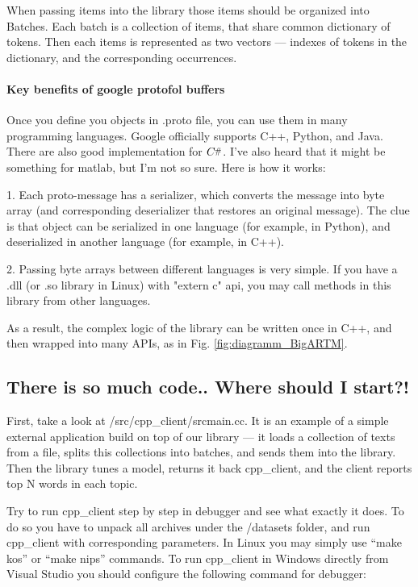 \documentclass[11pt,a4paper,twoside]{report}
\newcommand{\Csharp}{%
  {\settoheight{\dimen0}{C}C\kern-.05em \resizebox{!}{\dimen0}{\raisebox{\depth}{\#}}}}
\begin{document}
When passing items into the library those items should be organized into Batches.
Each batch is a collection of items, that share common dictionary of tokens.
Then each items is represented as two vectors --- indexes of tokens in the dictionary,
and the corresponding occurrences.

\paragraph{Key benefits of google protofol buffers}

Once you define you objects in .proto file, you can use them in many programming languages.
Google officially supports C++, Python, and Java. There are also good implementation for $\Csharp$.
I've also heard that it might be something for matlab, but I'm not so sure. Here is how it works:

1. Each proto-message has a serializer, which converts the message into byte array
(and corresponding deserializer that restores an original message).
The clue is that object can be serialized in one language (for example, in Python),
and deserialized in another language (for example, in C++).

2. Passing byte arrays between different languages is very simple.
If you have a .dll (or .so library in Linux) with "extern c" api,
you may call methods in this library from other languages.

As a result, the complex logic of the library can be written once in C++,
and then wrapped into many APIs, as in Fig. \ref{fig:diagramm_BigARTM}.

\subsection{There is so much code.. Where should I start?!}

First, take a look at /src/cpp\_client/srcmain.cc.
It is an example of a simple external application build on top of our library ---
it loads a collection of texts from a file,
splits this collections into batches, and sends them into the library.
Then the library tunes a model,
returns it back cpp\_client,
and the client reports top N words in each topic.

Try to run cpp\_client step by step in debugger and see what exactly it does.
To do so you have to unpack all archives under the /datasets folder,
and run cpp\_client with corresponding parameters.
In Linux you may simply use ``make kos'' or ``make nips'' commands.
To run cpp\_client in Windows directly from Visual Studio
you should configure the following command for debugger:
\end{document}
